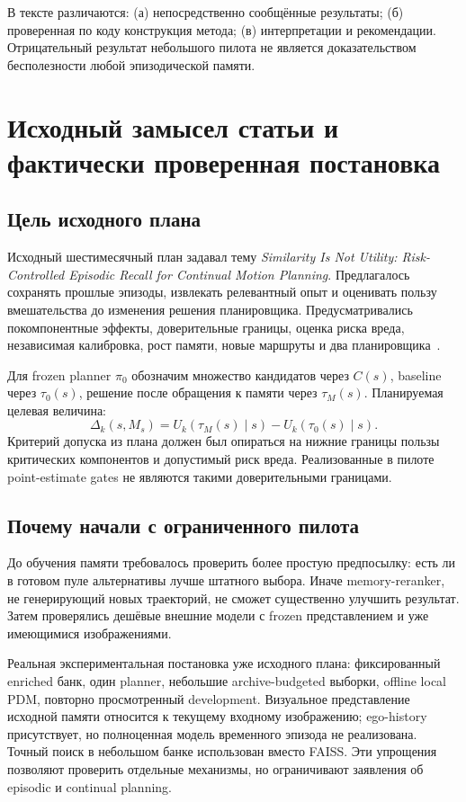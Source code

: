 \documentclass[11pt,a4paper]{article}
\begin{document}
В тексте различаются: (а) непосредственно сообщённые результаты; (б) проверенная по коду конструкция метода; (в) интерпретации и рекомендации. Отрицательный результат небольшого пилота не является доказательством бесполезности любой эпизодической памяти.

\section{Исходный замысел статьи и фактически проверенная постановка}
\subsection{Цель исходного плана}
Исходный шестимесячный план задавал тему \emph{Similarity Is Not Utility: Risk-Controlled Episodic Recall for Continual Motion Planning}. Предлагалось сохранять прошлые эпизоды, извлекать релевантный опыт и оценивать пользу вмешательства до изменения решения планировщика. Предусматривались покомпонентные эффекты, доверительные границы, оценка риска вреда, независимая калибровка, рост памяти, новые маршруты и два планировщика~\cite{plan}.

Для frozen planner $\pi_0$ обозначим множество кандидатов через $C(s)$, baseline через $\tau_0(s)$, решение после обращения к памяти через $\tau_M(s)$. Планируемая целевая величина:
\begin{equation}
 \Delta_k(s,M_s)=U_k(\tau_M(s)\mid s)-U_k(\tau_0(s)\mid s).
\end{equation}
Критерий допуска из плана должен был опираться на нижние границы пользы критических компонентов и допустимый риск вреда. Реализованные в пилоте point-estimate gates не являются такими доверительными границами.

\subsection{Почему начали с ограниченного пилота}
До обучения памяти требовалось проверить более простую предпосылку: есть ли в готовом пуле альтернативы лучше штатного выбора. Иначе memory-reranker, не генерирующий новых траекторий, не сможет существенно улучшить результат. Затем проверялись дешёвые внешние модели с frozen представлением и уже имеющимися изображениями.

Реальная экспериментальная постановка уже исходного плана: фиксированный enriched банк, один planner, небольшие archive-budgeted выборки, offline local PDM, повторно просмотренный development. Визуальное представление исходной памяти относится к текущему входному изображению; ego-history присутствует, но полноценная модель временного эпизода не реализована. Точный поиск в небольшом банке использован вместо FAISS. Эти упрощения позволяют проверить отдельные механизмы, но ограничивают заявления об episodic и continual planning.
\end{document}
